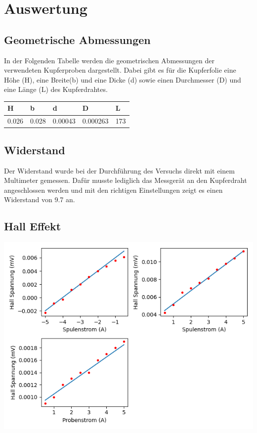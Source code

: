 \documentclass[titlepage=firstcover, captions=tableheading]{scrartcl}
\begin{document}
    
\section{Auswertung}

\subsection{Geometrische Abmessungen}

In der Folgenden Tabelle werden die geometrischen Abmessungen der verwendeten Kupferproben dargestellt.
Dabei gibt es für die Kupferfolie eine Höhe (H), eine Breite(b) und eine Dicke (d) sowie einen Durchmesser (D) und eine Länge (L) des Kupferdrahtes.

\begin{center}
    \begin{tabular}{lllll}
        \toprule
        H & b & d & D & L \\
        \midrule 
        0.026 & 0.028 & 0.00043 & 0.000263 & 173 \\
        \bottomrule
    \end{tabular}
\end{center}

\subsection{Widerstand}

Der Widerstand wurde bei der Durchführung des Versuchs direkt mit einem Multimeter gemessen.
Dafür musste lediglich das Messgerät an den Kupferdraht angeschlossen werden und mit den richtigen Einstellungen zeigt es einen Widerstand von 9.7 \Omega \; an.

\subsection{Hall Effekt}

\includegraphics{plothall.png}
\end{document}
